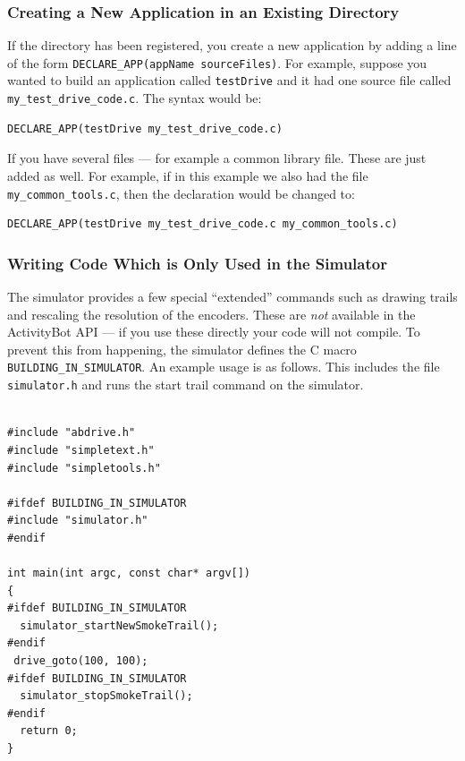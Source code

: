 \documentclass[a4paper]{article}
\begin{document}
\subsubsection{Creating a New Application in an Existing Directory}

If the directory has been registered, you create a new application by
adding a line of the form \verb+DECLARE_APP(appName sourceFiles)+. For
example, suppose you wanted to build an application called
\verb+testDrive+ and it had one source file called
\verb+my_test_drive_code.c+. The syntax would be:
\begin{verbatim}
DECLARE_APP(testDrive my_test_drive_code.c)
\end{verbatim}

If you have several files --- for example a common library file. These
are just added as well. For example, if in this example we also had
the file \verb+my_common_tools.c+, then the declaration would be
changed to:
\begin{verbatim}
DECLARE_APP(testDrive my_test_drive_code.c my_common_tools.c)
\end{verbatim}

\subsubsection{Writing Code Which is Only Used in the Simulator}

The simulator provides a few special ``extended'' commands such as
drawing trails and rescaling the resolution of the encoders. These are
\emph{not\/} available in the ActivityBot API --- if you use these
directly your code will not compile.  To prevent this from happening,
the simulator defines the C macro \verb+BUILDING_IN_SIMULATOR+. An
example usage is as follows. This includes the file \verb+simulator.h+
and runs the start trail command on the simulator.

\begin{verbatim}

#include "abdrive.h"
#include "simpletext.h"
#include "simpletools.h"

#ifdef BUILDING_IN_SIMULATOR
#include "simulator.h"
#endif

int main(int argc, const char* argv[])
{
#ifdef BUILDING_IN_SIMULATOR
  simulator_startNewSmokeTrail();
#endif
 drive_goto(100, 100);
#ifdef BUILDING_IN_SIMULATOR
  simulator_stopSmokeTrail();
#endif
  return 0;
}

\end{verbatim}
\end{document}
